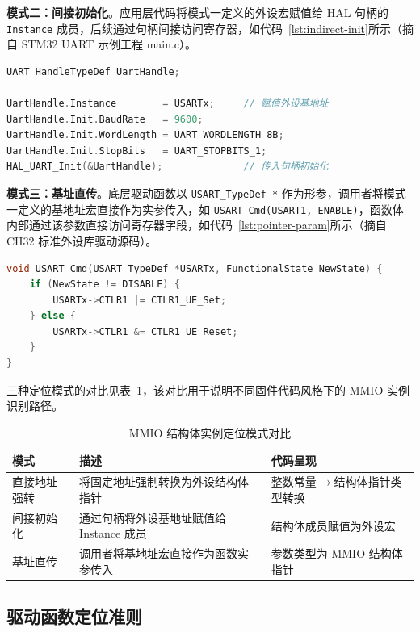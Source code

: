 \textbf{模式二：间接初始化}。应用层代码将模式一定义的外设宏赋值给 HAL 句柄的 \texttt{Instance} 成员，后续通过句柄间接访问寄存器，如代码~\ref{lst:indirect-init}所示（摘自 STM32 UART 示例工程 main.c）。

\begin{lstlisting}[style=CStyle,language=C,caption={间接初始化模式（main.c）},label=lst:indirect-init]
UART_HandleTypeDef UartHandle;

UartHandle.Instance        = USARTx;     // 赋值外设基地址
UartHandle.Init.BaudRate   = 9600;
UartHandle.Init.WordLength = UART_WORDLENGTH_8B;
UartHandle.Init.StopBits   = UART_STOPBITS_1;
HAL_UART_Init(&UartHandle);              // 传入句柄初始化
\end{lstlisting}

\textbf{模式三：基址直传}。底层驱动函数以 \texttt{USART\_TypeDef *} 作为形参，调用者将模式一定义的基地址宏直接作为实参传入，如 \texttt{USART\_Cmd(USART1, ENABLE)}，函数体内部通过该参数直接访问寄存器字段，如代码~\ref{lst:pointer-param}所示（摘自 CH32 标准外设库驱动源码）。

\begin{lstlisting}[style=CStyle,language=C,caption={基址直传模式（ch32v10x\_usart.c）},label=lst:pointer-param]
void USART_Cmd(USART_TypeDef *USARTx, FunctionalState NewState) {
    if (NewState != DISABLE) {
        USARTx->CTLR1 |= CTLR1_UE_Set;
    } else {
        USARTx->CTLR1 &= CTLR1_UE_Reset;
    }
}
\end{lstlisting}

三种定位模式的对比见表~\ref{tab:mmio-patterns}，该对比用于说明不同固件代码风格下的 MMIO 实例识别路径。

\begin{table}[htbp]
\centering
\caption{MMIO 结构体实例定位模式对比}
\label{tab:mmio-patterns}
\footnotesize
\begin{tabular}{lp{5cm}l}
\toprule
\textbf{模式} & \textbf{描述} & \textbf{代码呈现} \\
\midrule
直接地址强转 & 将固定地址强制转换为外设结构体指针 & 整数常量$\to$结构体指针类型转换 \\
间接初始化 & 通过句柄将外设基地址赋值给 Instance 成员 & 结构体成员赋值为外设宏 \\
基址直传 & 调用者将基地址宏直接作为函数实参传入 & 参数类型为 MMIO 结构体指针 \\
\bottomrule
\end{tabular}
\end{table}

\subsection{驱动函数定位准则}
\label{sec:design-driver-loc}

